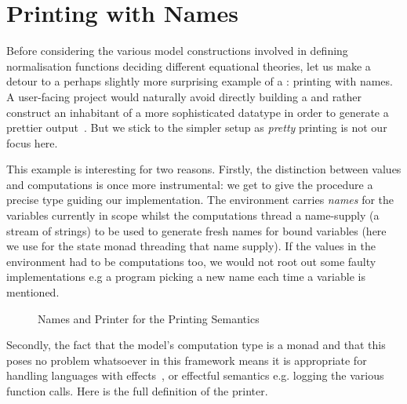 \section{Printing with Names}
\label{prettyprint}

Before considering the various model constructions involved in defining
normalisation functions deciding different equational theories, let us
make a detour to a perhaps slightly more surprising example of a
: printing with names. A user-facing project would naturally
avoid directly building a  and rather construct an inhabitant of
a more sophisticated datatype in order to generate a prettier output~\cite{hughes1995design,wadler2003prettier}.
But we stick to the simpler setup as \emph{pretty} printing is not our focus here.

This example is interesting for two reasons. Firstly, the distinction between
values and computations is once more instrumental: we get to give the procedure
a precise type guiding our implementation. The environment carries \emph{names}
for the variables currently in scope whilst the computations thread a name-supply
(a stream of strings) to be used to generate fresh names for bound variables
(here we use  for the state monad threading that name supply).
If the values in the environment had to be computations too, we would not root
out some faulty implementations e.g a program picking a new name each time a
variable is mentioned.

\begin{figure}[h]
\begin{minipage}{0.5\textwidth}
\end{minipage}
\begin{minipage}{0.5\textwidth}
\end{minipage}
\caption{Names and Printer for the Printing Semantics\label{fig:semprint}}
\end{figure}

Secondly, the fact that the model's computation type is a monad and that this
poses no problem whatsoever in this framework means it is appropriate for
handling languages with effects~\cite{moggi1991notions}, or effectful
semantics e.g. logging the various function calls. Here is the full definition
of the printer.


